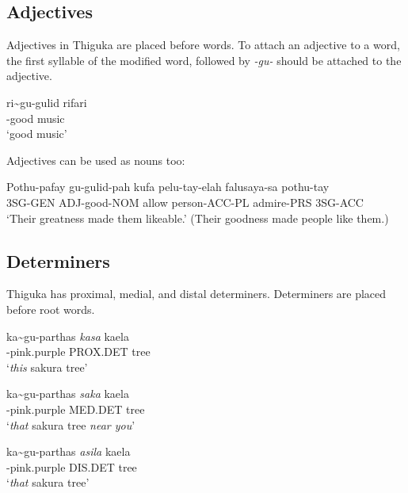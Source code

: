 \subsection{Adjectives}
Adjectives in Thiguka are placed before words. To attach an adjective to a word, the first syllable of the modified word, followed by \emph{-gu-} should be attached to the adjective.

\begin{exe}
    \ex{} \gll{}ri\~{}{}gu-gulid rifari\\
    \agradj{}-good music\\
    \glt{}`good music'
\end{exe}

Adjectives can be used as nouns too:

\begin{exe}
    \ex{} \gll{}Pothu-pafay gu-gulid-pah kufa pelu-tay-elah falusaya-sa pothu-tay\\
    3SG-GEN ADJ-good-NOM allow person-ACC-PL admire-PRS 3SG-ACC\\
    \glt{}`Their greatness made them likeable.' (Their goodness made people like them.)
\end{exe}

\subsection{Determiners}
Thiguka has proximal, medial, and distal determiners. Determiners are placed before root words. 

\begin{exe}
    \ex{} \gll{}ka\~{}{}gu-parthas \emph{kasa} kaela\\
    \agradj{}-pink.purple PROX.DET tree\\
    \glt{}`\emph{this} sakura tree'
\end{exe}

\begin{exe}
    \ex{} \gll{}ka\~{}{}gu-parthas \emph{saka} kaela\\
    \agradj{}-pink.purple MED.DET tree\\
    \glt{}`\emph{that} sakura tree \emph{near you}'
\end{exe}

\begin{exe}
    \ex{} \gll{}ka\~{}{}gu-parthas \emph{asila} kaela\\
    \agradj{}-pink.purple DIS.DET tree\\
    \glt{}`\emph{that} sakura tree'
\end{exe}

